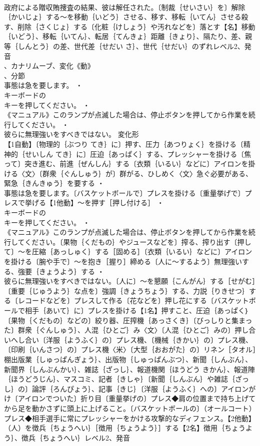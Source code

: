 \documentclass[8pt]{extreport}
\begin{document}
\begin{CJK}{UTF8}{min}
\\	政府による贈収賄捜査の結果、彼は解任された。〔制裁｛せいさい｝を〕解除｛かいじょ｝する～を移動｛いどう｝させる、移す、移転｛いてん｝させる殺す、削除｛さくじょ｝する〔化粧｛けしょう｝や汚れなどを〕落とす【名】移動｛いどう｝、移転｛いてん｝、転居｛てんきょ｝距離｛きょり｝、隔たり、差、親等｛しんとう｝の差、世代差｛せだい さ｝、世代｛せだい｝のずれレベル2、発音
\\	、カナリムーブ、変化《動》
\\	、分節
\\	事態は急を要します。 ・
\\	キーボードの
\\	キーを押してください。 ・
\\	《マニュアル》このランプが点滅した場合は、停止ボタンを押してから作業を続行してください。 ・
\\	彼らに無理強いをすべきではない。	変化形 
\\	【1自動】〔物理的｛ぶつり てき｝に〕押す、圧力｛あつりょく｝を掛ける〔精神的｛せいしん てき｝に〕圧迫｛あっぱく｝する、プレッシャーを掛ける〔焦って〕突き進む、前進｛ぜんしん｝する〔衣類｛いるい｝などに〕アイロンを掛ける〈文〉〔群衆｛ぐんしゅう｝が〕群がる、ひしめく〈文〉急ぐ必要がある、緊急｛きんきゅう｝を要する ・
\\	事態は急を要します。〔バスケットボールで〕プレスを掛ける〔重量挙げで〕プレスで挙げる【1他動】～を押す［押し付ける］ ・
\\	キーボードの
\\	キーを押してください。 ・
\\	《マニュアル》このランプが点滅した場合は、停止ボタンを押してから作業を続行してください。〔果物｛くだもの｝やジュースなどを〕搾る、搾り出す〔押して〕～を圧縮｛あっしゅく｝する［固める］〔衣類｛いるい｝などに〕アイロンを掛ける〔腕や手で〕～を抱き［握り］締める〔人に～するよう〕無理強いする、強要｛きょうよう｝する ・
\\	彼らに無理強いをすべきではない。〔人に〕～を懇願｛こんがん｝する［せがむ］〔重要｛じゅうよう｝な点を〕強調｛きょうちょう｝する、力説｛りきせつ｝する〔レコードなどを〕プレスして作る〔花などを〕押し花にする〔バスケットボールで相手｛あいて｝に〕プレスを掛ける【1名】押すこと、圧迫｛あっぱく｝〔果物｛くだもの｝などの〕絞り器、圧搾機｛あっさくき｝〔びっしりと集まった〕群衆｛ぐんしゅう｝、人混｛ひとご｝み〈文〉〔人混｛ひとご｝みの〕押し合いへし合い〔洋服｛ようふく｝の〕プレス機、〔機械｛きかい｝の〕プレス機、〔印刷｛いんさつ｝の〕プレス機〈米〉〔大型｛おおがた｝の〕リネン［タオル］棚出版業｛しゅっぱんぎょう｝、出版物｛しゅっぱんぶつ｝、新聞｛しんぶん｝、新聞界｛しんぶんかい｝、雑誌｛ざっし｝、報道機関｛ほうどう きかん｝、報道陣｛ほうどうじん｝、マスコミ、記者｛きしゃ｝〔新聞｛しんぶん｝や雑誌｛ざっし｝の〕論評｛ろんぴょう｝、記事｛きじ｝〔洋服｛ようふく｝への〕アイロンがけ〔アイロンでついた〕折り目〔重量挙げの〕プレス◆肩の位置まで持ち上げてから足を動かさずに頭上に上げること。〔バスケットボールの〕（オールコート）プレス◆相手選手に常にプレッシャーをかける攻撃的なディフェンス。【2他動】（人）を徴兵｛ちょうへい｝［徴用｛ちょうよう｝］する【2名】徴用｛ちょうよう｝、徴兵｛ちょうへい｝レベル2、発音

\end{CJK}
\end{document}
